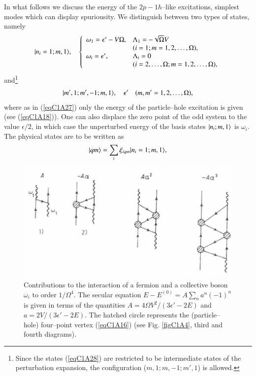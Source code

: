 In what follows we discuss the energy of the $2p-1h$--like excitations, simplest modes which can display spuriousity. We
distinguish between two types of states, namely
 \begin{align}\label{eqC1A27} 
|{n_i=1;m,1} \rangle,\quad\left\{
\begin{array}{ll}
\omega_1=\epsilon'-V\Omega, &\Lambda_1=-\sqrt{\Omega}V\\
&(i=1;m=1,2,\dots,\Omega),  \\ 
\omega_i=\epsilon', &\Lambda_i=0\\
&(i=2,\dots,\Omega; m=1,2,\dots,\Omega),
\end{array} \right. 
 \end{align}
and\footnote{Since the states (\ref{eqC1A28}) are restricted to be intermediate states of the perturbation
expansion, the configuration ($m,1;m,-1;m',1$) is allowed.}
 \begin{align}\label{eqC1A28} 
|{m',1;m',-1;m,1} \rangle,\quad\epsilon'\quad(m,m'=1,2,\dots,\Omega),
 \end{align}
 where as in (\ref{eqC1A27}) only the energy of the particle--hole excitation is given (see (\ref{eqC1A18})). One can also displace the zero point of the odd system to the value $\epsilon/2$, in which case the unperturbed energy of the basis states $|{n_i;m,1} \rangle$ is $\omega_i$.
The physical states are to be written as
 \begin{align}\label{eqC1A29} 
|{qm} \rangle=\sum_i\xi_{iqm}|{n_i=1;m,1} \rangle,
 \end{align}
  \begin{figure}
  \centerline {
  \includegraphics*[width=12cm]{introduccion/figs/fig19}
  }
  \caption{Contributions to the interaction of a fermion and a collective boson $\omega_i$ to order $1/\Omega^4$. The secular equation $E-E^{(0)}=A\sum_na^n(-1)^n$ is given in terms of the quantities $A=4\Omega V^2/(3\epsilon'-2E)$ and $a=2V/(3\epsilon'-2E)$. The hatched circle represents the (particle--hole) four--point vertex (\ref{eqC1A16}) (see Fig. \ref{figC1A4}, third and fourth diagrams).}
  \label{figC1A2}
  \end{figure}
